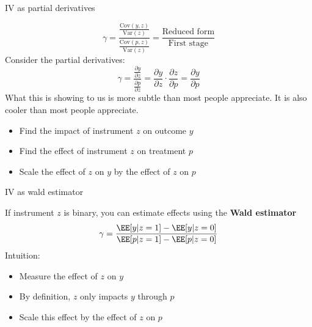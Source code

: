 \documentclass[compress, 8pt]{beamer}
\begin{document}
\begin{frame}{IV as partial derivatives}

\begin{equation*}
    \gamma = \frac{\frac{\text{Cov} (y, z)}{\text{Var} (z)}}{\frac{\text{Cov} (p, z)}{\text{Var} (z)}}
    = \frac{\text{Reduced form}}{\text{First stage}}
\end{equation*}
Consider the partial derivatives:
\begin{equation*}
    \gamma = \frac{\frac{\partial y}{\partial z}}{\frac{\partial p}{\partial z}}
    = \frac{\partial y}{\partial z} \cdot \frac{\partial z}{\partial p}
    = \frac{\partial y}{\partial p}
\end{equation*}
What this is showing to us is more subtle than most people appreciate. It is also cooler than most people appreciate. 
\begin{itemize}
    \item Find the impact of instrument $z$ on outcome $y$
    \item Find the effect of instrument $z$ on treatment $p$
    \item Scale the effect of $z$ on $y$ by the effect of $z$ on $p$
\end{itemize}

\end{frame}

\begin{frame}{IV as wald estimator}

If instrument $z$ is binary, you can estimate effects using the \textbf{Wald estimator}
\begin{equation*}
    \gamma = \frac{\EE [y \vert z = 1] - \EE [y \vert z= 0]}{\EE [p \vert z = 1] - \EE [p \vert z=0]}
\end{equation*}
Intuition:
\begin{itemize}
    \item Measure the effect of $z$ on $y$
    \item By definition, $z$ only impacts $y$ through $p$
    \item Scale this effect by the effect of $z$ on $p$
\end{itemize}


\end{frame}
\end{document}
